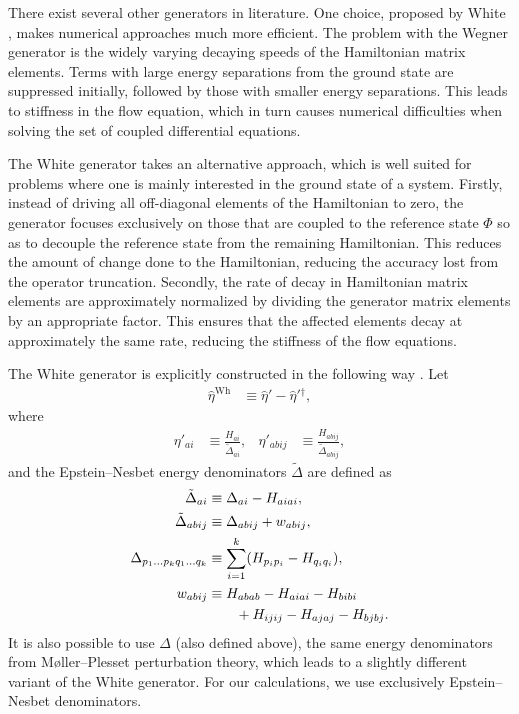 There exist several other generators in literature.  One choice, proposed by White \cite{White:cond-mat0201346}, makes numerical approaches much more efficient.  The problem with the Wegner generator is the widely varying decaying speeds of the Hamiltonian matrix elements.  Terms with large energy separations from the ground state are suppressed initially, followed by those with smaller energy separations.  This leads to stiffness in the flow equation, which in turn causes numerical difficulties when solving the set of coupled differential equations.

The White generator takes an alternative approach, which is well suited for problems where one is mainly interested in the ground state of a system.  Firstly, instead of driving all off-diagonal elements of the Hamiltonian to zero, the generator focuses exclusively on those that are coupled to the reference state $\Phi$ so as to decouple the reference state from the remaining Hamiltonian.  This reduces the amount of change done to the Hamiltonian, reducing the accuracy lost from the operator truncation.  Secondly, the rate of decay in Hamiltonian matrix elements are approximately normalized by dividing the generator matrix elements by an appropriate factor.  This ensures that the affected elements decay at approximately the same rate, reducing the stiffness of the flow equations.

The White generator is explicitly constructed in the following way \cite{PhysRevLett.106.222502,White:cond-mat0201346}.  Let
\begin{align*}
\hat{\eta}^{\text{Wh}} &\equiv \hat{\eta}' - \hat{\eta}'{}^\dagger,
\end{align*}
where
\begin{align*}
\eta'_{a i} &\equiv \frac{H_{a i}}{\tilde{\Delta}_{a i}}, &
\eta'_{a b i j} &\equiv \frac{H_{a b i j}}{\tilde{\Delta}_{a b i j}},
\end{align*}
and the Epstein--Nesbet energy denominators $\tilde{\Delta}$ \cite{shavitt2009many} are defined as
\begin{align}
\tilde{\Delta}_{a i} &\equiv \Delta_{a i} - H_{a i a i}, \notag \\
\tilde{\Delta}_{a b i j} &\equiv \Delta_{a b i j} + w_{a b i j}, \notag \\
\Delta_{p_1 \ldots p_k q_1 \ldots q_k} &\equiv \sum_{i = 1}^k (H_{p_i p_i} -  H_{q_i q_i}), \label{eq:moellerplessetdenominator} \\
w_{a b i j}
  &\equiv H_{a b a b} - H_{a i a i} - H_{b i b i} \notag \\
  &\qquad + H_{i j i j} - H_{a j a j} - H_{b j b j}. \notag
\end{align}
It is also possible \cite{IMSRG} to use $\Delta$ (also defined above), the same energy denominators from M\o ller--Plesset perturbation theory, which leads to a slightly different variant of the White generator.  For our calculations, we use exclusively Epstein--Nesbet denominators.

